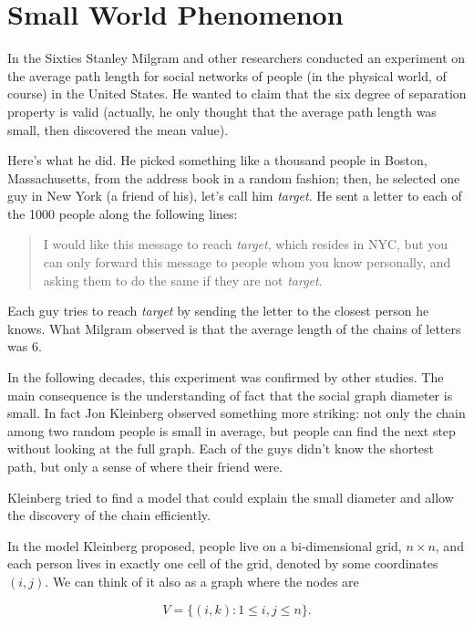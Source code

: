 \section{Small World Phenomenon}

In the Sixties Stanley Milgram and other researchers conducted an experiment on the average path length for social networks of people (in the physical world, of course)  in the United States. He wanted to claim that the six degree of separation property is valid (actually, he only thought that the average path length was small, then discovered the mean value).

Here's what he did. He picked something like a thousand people in Boston, Massachusetts, from the address book in a random fashion; then, he selected one guy in New York (a friend of his), let's call him \emph{target}. He sent a letter to each of the 1000 people along the following lines:

\begin{quote}
	I would like this message to reach \emph{target}, which resides in NYC, but you can only forward this message to people whom you know personally, and asking them to do the same if they are not \emph{target}.
\end{quote}
Each guy tries to reach \emph{target} by sending the letter to the closest person he knows. What Milgram observed is that the average length of the chains of letters was 6.

In the following decades, this experiment was confirmed by other studies. The main consequence is the understanding of fact that the social graph diameter is small. In fact Jon Kleinberg observed something more striking: not only the chain among two random people is small in average, but people can find the next step without looking at the full graph. Each of the guys didn't know the shortest path, but only a sense of where their friend were.

Kleinberg tried to find a model that could explain the small diameter and allow the discovery of the chain efficiently. 

In the model Kleinberg proposed, people live on a bi-dimensional grid, $n \times n$, and each person lives in exactly one cell of the grid, denoted by some coordinates $(i, j)$. We can think of it also as a graph where the nodes are

\begin{equation}
V = \{(i, k) : 1 \leq i,j\leq n\}.
\end{equation}

